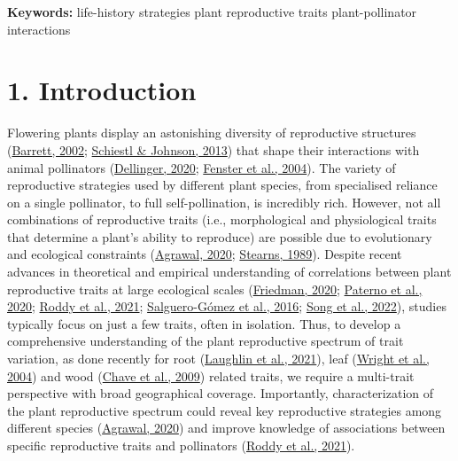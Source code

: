\documentclass[
  12pt,
  a4paper,
]{article}
\begin{document}
\textbf{Keywords:} life-history strategies \textbar{} plant reproductive traits \textbar{} plant-pollinator interactions

\doublespacing
\vspace{5mm}
\normalsize

\hypertarget{introduction}{%
\section{1. Introduction}\label{introduction}}

Flowering plants display an astonishing diversity of reproductive structures (\protect\hyperlink{ref-barrett2002}{Barrett, 2002}; \protect\hyperlink{ref-schiestl2013}{Schiestl \& Johnson, 2013}) that shape their interactions with animal pollinators (\protect\hyperlink{ref-dellinger2020}{Dellinger, 2020}; \protect\hyperlink{ref-fenster2004}{Fenster et al., 2004}). The variety of reproductive strategies used by different plant species, from specialised reliance on a single pollinator, to full self-pollination, is incredibly rich. However, not all combinations of reproductive traits (i.e., morphological and physiological traits that determine a plant's ability to reproduce) are possible due to evolutionary and ecological constraints (\protect\hyperlink{ref-agrawal2020}{Agrawal, 2020}; \protect\hyperlink{ref-stearns1989}{Stearns, 1989}). Despite recent advances in theoretical and empirical understanding of correlations between plant reproductive traits at large ecological scales (\protect\hyperlink{ref-friedman2020}{Friedman, 2020}; \protect\hyperlink{ref-paterno2020}{Paterno et al., 2020}; \protect\hyperlink{ref-roddy2021}{Roddy et al., 2021}; \protect\hyperlink{ref-salguero2016}{Salguero-Gómez et al., 2016}; \protect\hyperlink{ref-song2022}{Song et al., 2022}), studies typically focus on just a few traits, often in isolation. Thus, to develop a comprehensive understanding of the plant reproductive spectrum of trait variation, as done recently for root (\protect\hyperlink{ref-laughlin2021}{Laughlin et al., 2021}), leaf (\protect\hyperlink{ref-wright2004}{Wright et al., 2004}) and wood (\protect\hyperlink{ref-chave2009}{Chave et al., 2009}) related traits, we require a multi-trait perspective with broad geographical coverage. Importantly, characterization of the plant reproductive spectrum could reveal key reproductive strategies among different species (\protect\hyperlink{ref-agrawal2020}{Agrawal, 2020}) and improve knowledge of associations between specific reproductive traits and pollinators (\protect\hyperlink{ref-roddy2021}{Roddy et al., 2021}).
\end{document}
